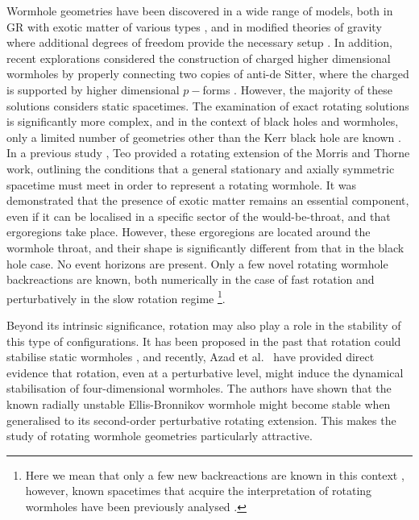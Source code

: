 \documentclass[aps,preprint,groupedaddress,nofootinbib,superscriptaddress,showkeys,showpacs,eqsecnum,amsmath,amssymb]{revtex4-1}
\begin{document}
Wormhole geometries have been discovered in a wide range of models, both in GR with exotic matter of various types \cite{Hochberg:1996ee,Konoplya:2021hsm,Lobo:2005us,Bronnikov:2005gm}, and in modified theories of gravity where additional degrees of freedom provide the necessary setup \cite{Lobo:2009ip,Antoniou:2019awm,Bronnikov:2013coa,Bronnikov:2015pha,Korolev:2014hwa,Harko:2013yb,Rahman:2023swz}. In addition, recent explorations considered the construction of charged higher dimensional wormholes by properly connecting two copies of anti-de Sitter, where the charged is supported by higher dimensional $p-$forms \cite{Deshpande:2022zfm}.
However, the majority of these solutions considers static spacetimes. The examination of exact rotating solutions is significantly more complex, and in the context of black holes and wormholes, only a limited number of geometries other than the Kerr black hole are known \cite{Stephani:2003tm}. In a previous study \cite{Teo:1998dp}, Teo provided a rotating extension of the Morris and Thorne work, outlining the conditions that a general stationary and axially symmetric spacetime must meet in order to represent a rotating wormhole. It was demonstrated that the presence of exotic matter remains an essential component, even if it can be localised in a specific sector of the would-be-throat, and that ergoregions take place. However, these ergoregions are located around the wormhole throat, and their shape is significantly different from that in the black hole case. No event horizons are present. Only a few novel rotating wormhole backreactions are known, both numerically in the case of fast rotation and perturbatively in the slow rotation regime \cite{Kashargin:2007mm,Kashargin:2008pk,Kleihaus:2014dla,Chew:2016epf}
\footnote{Here we mean that only a few new backreactions are known in this context \cite{Matos:2010pcd,DelAguila:2015isj}, however, known spacetimes that acquire the interpretation of rotating wormholes have been previously analysed \cite{Clement:2022pjr,Anabalon:2018rzq}.}. 

Beyond its intrinsic significance, rotation may also play a role in the stability of this type of configurations. It has been proposed in the past that rotation could stabilise static wormholes \cite{Matos:2005uh}, and recently, Azad et al.~\cite{Azad:2023iju} have provided direct evidence that rotation, even at a perturbative level, might induce the dynamical stabilisation of four-dimensional wormholes. The authors have shown that the known radially unstable Ellis-Bronnikov wormhole \cite{Ellis:1973yv,Bronnikov:1973fh} might become stable when generalised to its second-order perturbative rotating extension. This makes the study of rotating wormhole geometries particularly attractive.\\
\end{document}
